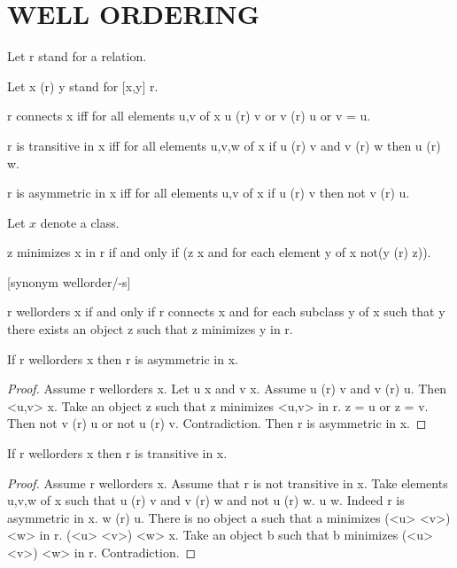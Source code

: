 \documentclass[a4paper,draft]{amsproc}
\begin{document}
\section{WELL ORDERING}
\begin{forthel}

Let r stand for a relation.

Let x (r) y stand for [x,y] \in r.

\begin{definition}[82]
r connects x iff for all elements u,v of x u (r) v or v (r) u or v = u.
\end{definition}

\begin{definition}[83]
r is transitive in x iff for all elements u,v,w of x if u (r) v and v (r) w then u (r) w.
\end{definition}

\begin{definition}[84]
r is asymmetric in x iff for all elements u,v of x if u (r) v then not v (r) u.
\end{definition}


Let $x$ denote a class.
\begin{definition}[86]
z minimizes x in r if and only if (z \in x and for each element y of x not(y (r) z)).
\end{definition}

[synonym wellorder/-s]
\begin{definition}[87]
r wellorders x if and only if r connects x and for each subclass y of x such that y 
there exists an object z such that z minimizes y in r.
\end{definition}

\begin{theorem}[88a]
If r wellorders x then r is asymmetric in x.
\end{theorem}
\begin{proof}
Assume r wellorders x.
Let u \in x and v \in x.
Assume u (r) v and v (r) u.
Then <u,v> \subset x.
Take an object z such that z minimizes <u,v> in r.
z = u or z = v.
Then not v (r) u or not u (r) v.
Contradiction. 
Then r is asymmetric in x.
\end{proof}

\begin{theorem}[88b]
If r wellorders x then r is transitive in x.
\end{theorem}
\begin{proof}
Assume r wellorders x.
Assume that r is not transitive in x.
Take elements u,v,w of x such that 
u (r) v and v (r) w and not u (r) w.
u \neq w. Indeed r is asymmetric in x.
w (r) u.
There is no object a such that a minimizes (<u> \cup <v>) \cup <w> in r.
(<u> \cup <v>) \cup <w> \subset x.
Take an object b such that b minimizes (<u> \cup <v>) \cup <w> in r.
Contradiction.
\end{proof}


\end{forthel}
\end{document}
